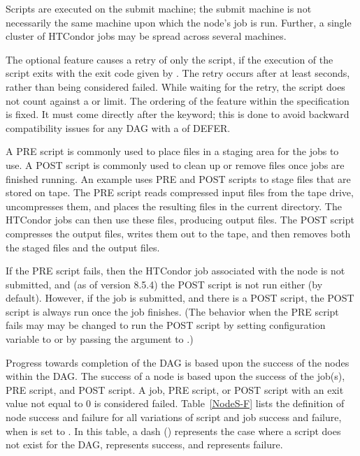 Scripts are executed on the submit machine;
the submit machine is not necessarily
the same machine upon which the node's job is run.
Further, a single cluster of HTCondor jobs may be
spread across several machines.

The optional  feature causes a retry of only the script,
if the execution of the script exits with the
exit code given by .
The retry occurs after at least  seconds, 
rather than being considered failed.  
While waiting for the retry,
the script does not count against a  or  limit.
The ordering of the  feature within the  
specification is fixed.
It must come directly after the  keyword;
this is done to avoid backward compatibility issues for any
DAG with a  of DEFER.

A PRE script is commonly used
to place files in a staging area for the jobs to use.
A POST script is commonly used
to clean up or remove files once jobs are finished running.
An example uses PRE and POST scripts to stage files
that are stored on tape.
The PRE script reads compressed input files from the tape drive,
uncompresses them, and places the resulting files in the current directory.
The HTCondor jobs can then use these files,
producing output files.
The POST script compresses the output files, writes them out to
the tape, and then removes both the staged files and the output files.

If the PRE script fails, 
then the HTCondor job associated with the node is not submitted,
and (as of version 8.5.4) the POST
script is not run either (by default).
However, if the job is submitted, and there is a POST script, the POST
script is always run once the job finishes.
(The behavior when the PRE script fails may
may be changed to run the POST script
by setting configuration variable  
to  or by passing the 
argument to .)

Progress towards completion of the DAG is based upon
the success of the nodes within the DAG.
The success of a node is based upon the success of 
the job(s), PRE script, and POST script.
A job, PRE script, or POST script with an exit value not equal to 0 is
considered failed.  
Table~\ref{NodeS-F} lists the definition of node success and
failure for all variations of script and job success and failure,
when  is set to .
In this table, a dash (\Expr{-}) represents the case where a script
does not exist for the DAG,  represents success, 
and   represents failure.

